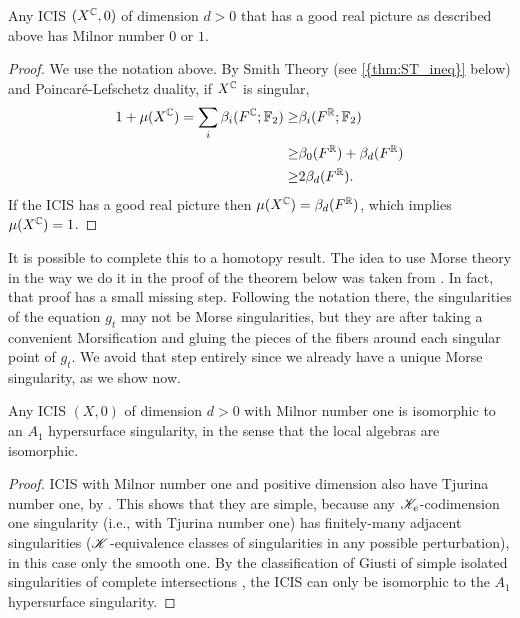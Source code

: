 \documentclass[a4paper,12pt]{amsart}
\begin{document}
\begin{proposition}\label{prop:iciscase}
Any ICIS $(X^{\mathbb{C}},0)$ of dimension $d>0$ that has a good real picture as described above has Milnor number $0$ or $1$.
\end{proposition}
\begin{proof}
We use the notation above. By Smith Theory (see \cref{{thm:ST_ineq}} below) and  Poincaré-Lefschetz duality, if $X^{\mathbb{C}}$ is singular,
\[\begin{aligned}
1+\mu(X^{\mathbb{C}})=\sum_i \beta_i(F^{\mathbb{C}};\mathbb{F}_2)\geq &\beta_i(F^{\mathbb{R}};\mathbb{F}_2) \\
\geq&\beta_0(F^{\mathbb{R}})+\beta_d(F^{\mathbb{R}})\\
\geq&2\beta_d(F^{\mathbb{R}}).
\end{aligned}\]
If the ICIS has a good real picture then $\mu(X^{\mathbb{C}})=\beta_d(F^{\mathbb{R}})$, which implies $\mu(X^{\mathbb{C}})=1$.
\end{proof}

It is possible to complete this to a homotopy result. The idea to use Morse theory in the way we do it in the proof of the theorem below was taken from \cite[Lemma 2-2]{Mond1996}. In fact, that proof has a small missing step. Following the notation there, the singularities of the equation $g_t$ may not be Morse singularities, but they are after taking a convenient Morsification and gluing the pieces of the fibers around each singular point of $g_t$. We avoid that step entirely since we already have a unique Morse singularity, as we show now.

\begin{lemma}\label{lem:milnorone}
Any ICIS $(X,0)$ of dimension $d>0$ with Milnor number one is isomorphic to an $A_1$ hypersurface singularity, in the sense that the local algebras are isomorphic.
\end{lemma}
\begin{proof}
ICIS with Milnor number one and positive dimension also have Tjurina number one, by \cite[Theorem]{Looijenga1985}. This shows that they are simple, because any $\mathscr{K}_e$-codimension one singularity (i.e., with Tjurina number one) has finitely-many adjacent singularities ($\mathscr{K}$-equivalence classes of singularities in any possible perturbation), in this case only the smooth one. By the classification of Giusti of simple isolated singularities of complete intersections \cite[Théorème]{Giusti1983}, the ICIS can only be isomorphic to the $A_1$ hypersurface singularity.
\end{proof}
\end{document}
